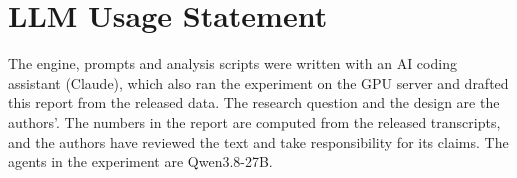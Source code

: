 \documentclass[11pt]{article}
\begin{document}
\section*{LLM Usage Statement}

The engine, prompts and analysis scripts were written with an AI coding assistant (Claude), which also ran the experiment on the GPU server and drafted this report from the released data. The research question and the design are the authors'. The numbers in the report are computed from the released transcripts, and the authors have reviewed the text and take responsibility for its claims. The agents in the experiment are Qwen3.8-27B.
\end{document}
